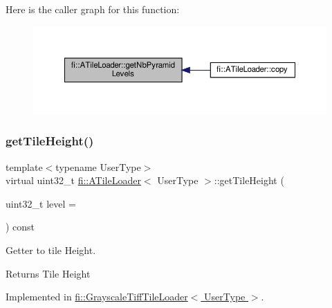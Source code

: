 Here is the caller graph for this function\+:
\nopagebreak
\begin{figure}[H]
\begin{center}
\leavevmode
\includegraphics[width=350pt]{dc/d54/classfi_1_1ATileLoader_ad6550495be22454b5f72d46c68622c37_icgraph}
\end{center}
\end{figure}
\mbox{\label{classfi_1_1ATileLoader_a531ceb7c73457fdde7055e95abd777fa}} 
\subsubsection{\texorpdfstring{get\+Tile\+Height()}{getTileHeight()}}
{\footnotesize\ttfamily template$<$typename User\+Type$>$ \\
virtual uint32\+\_\+t \hyperlink{classfi_1_1ATileLoader}{fi\+::\+A\+Tile\+Loader}$<$ User\+Type $>$\+::get\+Tile\+Height (\begin{DoxyParamCaption}\item[{uint32\+\_\+t}]{level = {} }\end{DoxyParamCaption}) const\hspace{0.3cm}{\ttfamily [pure virtual]}}



Getter to tile Height. 

\begin{DoxyReturn}{Returns}
Tile Height 
\end{DoxyReturn}


Implemented in \hyperlink{classfi_1_1GrayscaleTiffTileLoader_aa1ac88ed6b9505d5c98b9202e6f1ee6d}{fi\+::\+Grayscale\+Tiff\+Tile\+Loader$<$ User\+Type $>$}.

